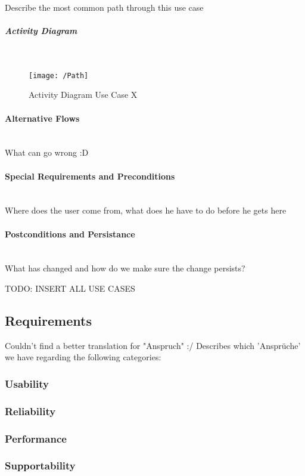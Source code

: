 Describe the most common path through this use case

\subparagraph{Activity Diagram}\mbox{}\\
\begin{figure}[h]
	\centering
	\texttt{[image: /Path]}
	\caption{Activity Diagram Use Case X}
	\label{fig:activityDiagramX}
\end{figure}

\paragraph{Alternative Flows}\mbox{}\\
What can go wrong :D

\paragraph{Special Requirements and Preconditions}\mbox{}\\
Where does the user come from, what does he have to do before he gets here

\paragraph{Postconditions and Persistance}\mbox{}\\
What has changed and how do we make sure the change persists?

TODO: INSERT ALL USE CASES

\subsection{Requirements}
\label{sec:domainBc}
Couldn't find a better translation for "Anspruch" :/
Describes which 'Ansprüche' we have regarding the following categories:
\subsubsection{Usability}
\label{sec:domainBca}
\subsubsection{Reliability}
\label{sec:domainBcb}
\subsubsection{Performance}
\label{sec:domainBcc}
\subsubsection{Supportability}
\label{sec:domainBcd}

